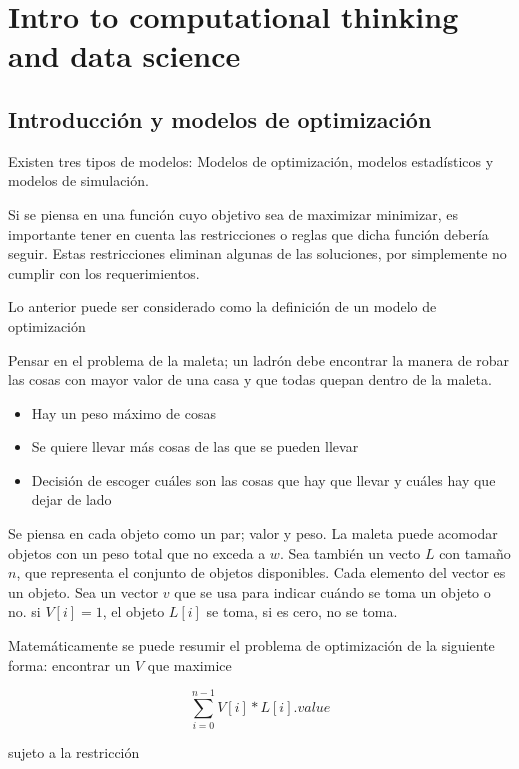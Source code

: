 \chapter{Intro to computational thinking and data science}

\section{Introducción y modelos de optimización}

Existen tres tipos de modelos: Modelos de optimización, modelos estadísticos y modelos de simulación.

Si se piensa en una función cuyo objetivo sea de maximizar  minimizar, es importante tener en cuenta las restricciones o reglas que dicha función debería seguir. Estas restricciones eliminan algunas de las soluciones, por simplemente no cumplir con los requerimientos.

Lo anterior puede ser considerado como la definición de un modelo de optimización

Pensar en el problema de la maleta; un ladrón debe encontrar la manera de robar las cosas con mayor valor de una casa y que todas quepan dentro de la maleta.

\begin{itemize}
    \item Hay un peso máximo de cosas
    \item Se quiere llevar más cosas de las que se pueden llevar
    \item Decisión de escoger cuáles son las cosas que hay que llevar y cuáles hay que dejar de lado
\end{itemize}

Se piensa en cada objeto como un par; valor y peso.
La maleta puede acomodar objetos con un peso total que no exceda a $w$. Sea también un vecto $L$ con tamaño $n$, que representa el conjunto de objetos disponibles. Cada elemento del vector es un objeto. 
Sea un vector $v$ que se usa para indicar cuándo se toma un objeto o no. si $V[i] = 1$, el objeto $L[i]$ se toma, si es cero, no se toma.

Matemáticamente se puede resumir el problema de optimización de la siguiente forma: encontrar un $V$ que maximice

\begin{equation}
    \sum_{i=0}^{n-1} V[i] * L[i].value
\end{equation}

sujeto a la restricción


